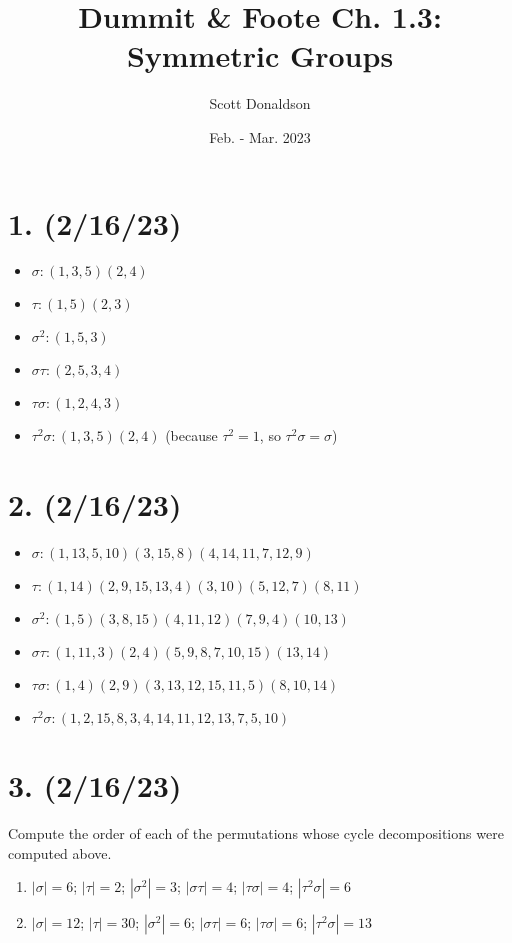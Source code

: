 \documentclass{article}
\title{Dummit \& Foote Ch. 1.3: Symmetric Groups}
\author{Scott Donaldson}
\date{Feb. - Mar. 2023}
\begin{document}
\maketitle

\section*{1. (2/16/23)}

\begin{itemize}[itemsep=0em]
    \item $\sigma: (1, 3, 5)(2, 4)$
    \item $\tau: (1, 5)(2, 3)$
    \item $\sigma^2: (1, 5, 3)$
    \item $\sigma \tau: (2, 5, 3, 4)$
    \item $\tau \sigma: (1, 2, 4, 3)$
    \item $\tau^2 \sigma: (1, 3, 5)(2, 4)$ (because $\tau^2 = 1$, so $\tau^2 \sigma = \sigma$)
\end{itemize}

\section*{2. (2/16/23)}

\begin{itemize}[itemsep=0em]
    \item $\sigma: (1,13,5,10)(3,15,8)(4,14,11,7,12,9)$
    \item $\tau: (1, 14)(2, 9, 15, 13, 4)(3, 10)(5, 12, 7)(8, 11)$
    \item $\sigma^2: (1, 5)(3, 8, 15)(4, 11, 12)(7, 9, 4)(10, 13)$
    \item $\sigma \tau: (1, 11, 3)(2, 4)(5, 9, 8, 7, 10, 15)(13, 14)$
    \item $\tau \sigma: (1, 4)(2, 9)(3, 13, 12, 15, 11, 5)(8, 10, 14)$
    \item $\tau^2 \sigma: (1, 2, 15, 8, 3, 4, 14, 11, 12, 13, 7, 5, 10)$
\end{itemize}

\section*{3. (2/16/23)}

Compute the order of each of the permutations whose cycle decompositions were computed above.

\begin{enumerate}[itemsep=0em]
    \item $|\sigma| = 6$; $|\tau| = 2$; $|\sigma^2| = 3$; $|\sigma \tau| = 4$; $|\tau \sigma| = 4$; $|\tau^2 \sigma| = 6$
    \item $|\sigma| = 12$; $|\tau| = 30$; $|\sigma^2| = 6$; $|\sigma \tau| = 6$; $|\tau \sigma| = 6$; $|\tau^2 \sigma| = 13$
\end{enumerate}
\end{document}
